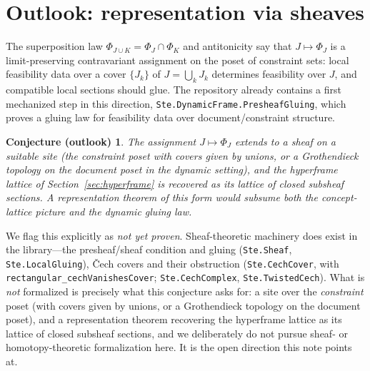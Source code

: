 \documentclass[11pt]{article}
\newtheorem*{conjecture}{Conjecture (outlook)}
\newcommand{\lean}[1]{\texttt{#1}}
\begin{document}
\section{Outlook: representation via sheaves}
\label{sec:sheaves}

The superposition law $\Phi_{J\cup K} = \Phi_J \cap \Phi_K$ and
antitonicity say that $J \mapsto \Phi_J$ is a limit-preserving
contravariant assignment on the poset of constraint sets: local
feasibility data over a cover $\{J_k\}$ of $J = \bigcup_k J_k$
determines feasibility over $J$, and compatible local sections should
glue.  The repository already contains a first mechanized step in this
direction, \lean{Ste.DynamicFrame.PresheafGluing}, which proves a
gluing law for feasibility data over document/constraint structure.

\begin{conjecture}
The assignment $J \mapsto \Phi_J$ extends to a sheaf on a suitable site
(the constraint poset with covers given by unions, or a Grothendieck
topology on the document poset in the dynamic setting), and the
hyperframe lattice of Section~\ref{sec:hyperframe} is recovered as its
lattice of closed subsheaf sections.  A representation theorem of this
form would subsume both the concept-lattice picture and the dynamic
gluing law.
\end{conjecture}

We flag this explicitly as \emph{not yet proven}.  Sheaf-theoretic
machinery does exist in the library---the presheaf/sheaf condition and
gluing (\texttt{Ste.Sheaf}, \texttt{Ste.LocalGluing}), \v{C}ech covers
and their obstruction (\texttt{Ste.CechCover}, with
\texttt{rectangular\_cechVanishesCover}; \texttt{Ste.CechComplex},
\texttt{Ste.TwistedCech}).  What is \emph{not} formalized is precisely
what this conjecture asks for: a site over the \emph{constraint} poset
(with covers given by unions, or a Grothendieck topology on the
document poset), and a representation theorem recovering the
hyperframe lattice as its lattice of closed subsheaf sections, and
we deliberately do not pursue sheaf- or homotopy-theoretic
formalization here.  It is the open direction this note points at.



\end{document}
